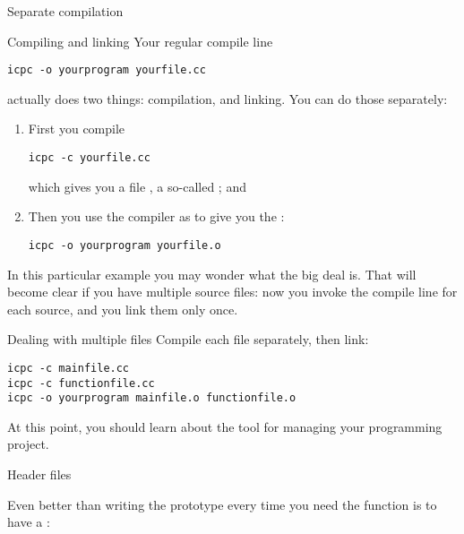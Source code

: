  {Separate compilation}

\begin{block}{Compiling and linking}
  \label{sl:compile-link}
  Your regular compile line
\begin{verbatim}
icpc -o yourprogram yourfile.cc
\end{verbatim}
  actually does two things: compilation, and linking. You can do those
  separately:
  \begin{enumerate}
  \item First you compile
\begin{verbatim}
icpc -c yourfile.cc
\end{verbatim}
  which gives you a file , a so-called
  ; and
  \item Then you use the compiler as  to give you
    the :
\begin{verbatim}
icpc -o yourprogram yourfile.o
\end{verbatim}
  \end{enumerate}
\end{block}

In this particular example you may wonder what the big deal is.
That will become clear if you have multiple source files: now you
invoke the compile line for each source, and you link them only once.

\begin{block}{Dealing with multiple files}
  \label{sl:link-multiple}
  Compile each file separately, then link:
\begin{verbatim}
icpc -c mainfile.cc
icpc -c functionfile.cc
icpc -o yourprogram mainfile.o functionfile.o
\end{verbatim}  
\end{block}

At this point, you should learn about the  tool for
managing your programming project.

 {Header files}
\label{sec:headerfile}
\label{sec:hfile}

Even better than writing the prototype every time you need the
function is to have a :

